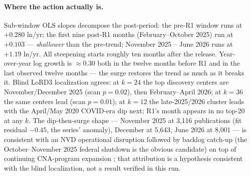 \documentclass[11pt]{article}
\begin{document}
\paragraph{Where the action actually is.} Sub-window OLS slopes decompose
the post-period: the pre-R1 window runs at $+0.280$ ln/yr; the first nine
post-R1 months (February--October 2025) run at $+0.103$ --- \emph{shallower}
than the pre-trend; November 2025 -- June 2026 runs at $+1.19$ ln/yr. All
steepening starts roughly ten months after the release. Year-over-year log
growth is $\approx 0.30$ both in the twelve months before R1 and in the last
observed twelve months --- the surge restores the trend as much as it breaks
it. Blind LoRD3 localization agrees: at $k=24$ the top discovery centers are
November/December 2025 (scan $p=0.02$), then February--April 2026; at
$k=36$ the same centers lead (scan $p=0.01$); at $k=12$ the late-2025/2026
cluster leads with the April/May 2020 COVID-era dip next; R1's month appears
in no top-20 at any $k$. The dip-then-surge shape --- November 2025 at
3{,}116 publications (fit residual $-0.45$, the series' anomaly), December
at 5{,}643, June 2026 at 8{,}001 --- is consistent with an NVD operational
disruption followed by backlog catch-up (the October--November 2025 federal
shutdown is the obvious candidate) on top of continuing CNA-program
expansion \cite{nist2026}; that attribution is a hypothesis consistent with
the blind localization, not a result verified in this run.
\end{document}

